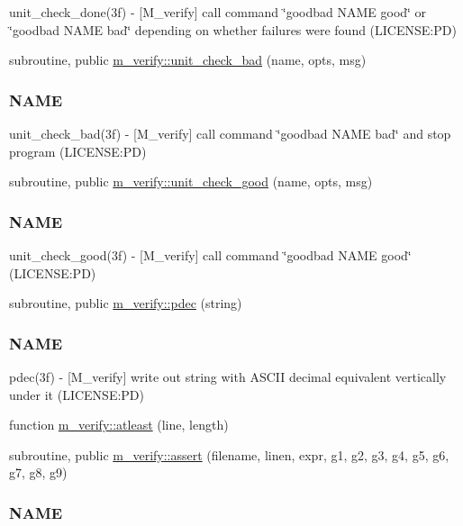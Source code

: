\begin{DoxyCompactItemize}
\begin{DoxyCompactList}
unit\+\_\+check\+\_\+done(3f) -\/ \mbox{[}M\+\_\+verify\mbox{]} call command \char`\"{}goodbad N\+A\+M\+E good\char`\"{} or \char`\"{}goodbad N\+A\+M\+E bad\char`\"{} depending on whether failures were found (L\+I\+C\+E\+N\+SE\+:PD) \end{DoxyCompactList}\item 
subroutine, public \mbox{\hyperlink{namespacem__verify_aaa2744e5ab1687072183869bd53cc086}{m\+\_\+verify\+::unit\+\_\+check\+\_\+bad}} (name, opts, msg)
\begin{DoxyCompactList}\small\item\em \subsubsection*{N\+A\+ME}

unit\+\_\+check\+\_\+bad(3f) -\/ \mbox{[}M\+\_\+verify\mbox{]} call command \char`\"{}goodbad N\+A\+M\+E bad\char`\"{} and stop program (L\+I\+C\+E\+N\+SE\+:PD) \end{DoxyCompactList}\item 
subroutine, public \mbox{\hyperlink{namespacem__verify_a9d5ed59a1ac977dd7ab23e0d1fb54de4}{m\+\_\+verify\+::unit\+\_\+check\+\_\+good}} (name, opts, msg)
\begin{DoxyCompactList}\small\item\em \subsubsection*{N\+A\+ME}

unit\+\_\+check\+\_\+good(3f) -\/ \mbox{[}M\+\_\+verify\mbox{]} call command \char`\"{}goodbad N\+A\+M\+E good\char`\"{} (L\+I\+C\+E\+N\+SE\+:PD) \end{DoxyCompactList}\item 
subroutine, public \mbox{\hyperlink{namespacem__verify_aa772ce395fd2e4cc546b8645d8fd9949}{m\+\_\+verify\+::pdec}} (string)
\begin{DoxyCompactList}\small\item\em \subsubsection*{N\+A\+ME}

pdec(3f) -\/ \mbox{[}M\+\_\+verify\mbox{]} write out string with A\+S\+C\+II decimal equivalent vertically under it (L\+I\+C\+E\+N\+SE\+:PD) \end{DoxyCompactList}\item 
function \mbox{\hyperlink{namespacem__verify_a6185c00609b8f0e4c5a503cfadcb2490}{m\+\_\+verify\+::atleast}} (line, length)
\item 
subroutine, public \mbox{\hyperlink{namespacem__verify_a83a6bafddb101d8b0fe70f34827836ff}{m\+\_\+verify\+::assert}} (filename, linen, expr, g1, g2, g3, g4, g5, g6, g7, g8, g9)
\begin{DoxyCompactList}\small\item\em \subsubsection*{N\+A\+ME}


\end{DoxyCompactList}
\end{DoxyCompactItemize}
